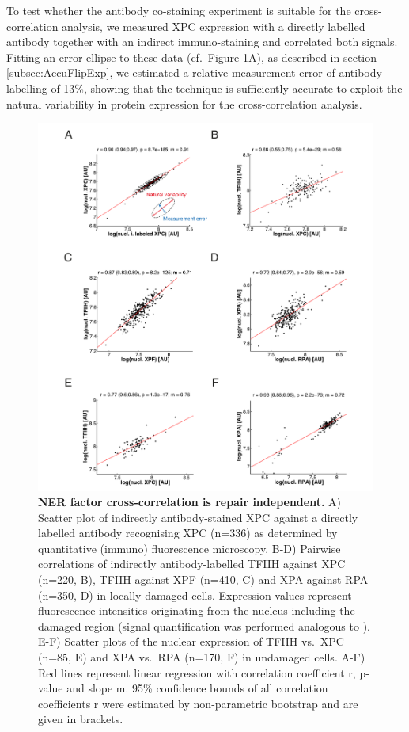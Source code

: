 To test whether the antibody co-staining experiment is suitable for the cross-correlation analysis, we measured XPC expression with a directly labelled antibody together with an indirect immuno-staining and correlated both signals. Fitting an error ellipse to these data (cf.\ Figure \ref{fig:coExpressionData}A), as described in section  \ref{subsec:AccuFlipExp}, we estimated a relative measurement error of antibody labelling of 13\%, showing that the technique is sufficiently accurate to exploit the natural variability in protein expression for the cross-correlation analysis.
\begin{figure}[htbp]
	\begin{center}
		\includegraphics[width=1\textwidth]{Abbildungen/figureTAC_2.pdf}
		\caption{\textbf{NER factor cross-correlation is repair independent.} A) Scatter plot of indirectly antibody-stained XPC against a directly labelled antibody recognising XPC (n=336) as determined by quantitative (immuno) fluorescence microscopy. B-D) Pairwise correlations of indirectly antibody-labelled TFIIH against XPC (n=220, B), TFIIH against XPF (n=410, C) and XPA against RPA (n=350, D) in locally damaged cells. Expression values represent fluorescence intensities originating from the nucleus including the damaged region (signal quantification was performed analogous to \cite{Luijsterburg2010}). E-F) Scatter plots of the nuclear expression of TFIIH vs.\ XPC (n=85, E) and XPA vs.\ RPA (n=170, F) in undamaged cells. A-F) Red lines represent linear regression with correlation coefficient r, p-value and slope m. 95\% confidence bounds of all correlation coefficients r were estimated by non-parametric bootstrap and are given in brackets. }
		\label{fig:coExpressionData}
	\end{center}
\end{figure}

